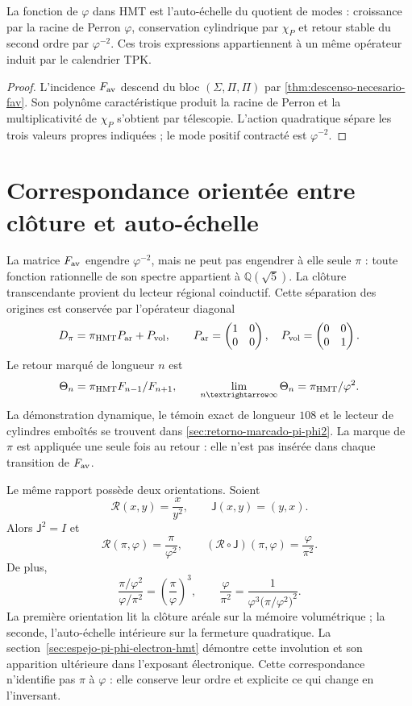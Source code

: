 \begin{proposition}
\label{prop:autoescala-phi-rev6}
La fonction de \(\varphi\) dans HMT est l'auto-échelle du quotient de modes :
croissance par la racine de Perron \(\varphi\), conservation cylindrique par
\(\chi_P\) et retour stable du second ordre par \(\varphi^{-2}\).
Ces trois expressions appartiennent à un même opérateur induit par le
calendrier TPK.
\end{proposition}

\begin{proof}
L'incidence \(F_{\rm av}\) descend du bloc
\((\Sigma,\Pi,\Pi)\) par
\cref{thm:descenso-necesario-fav}. Son polynôme caractéristique produit la
racine de Perron et la multiplicativité de \(\chi_P\) s'obtient par
télescopie. L'action quadratique sépare les trois valeurs propres indiquées ; le
mode positif contracté est \(\varphi^{-2}\).
\end{proof}

\section{Correspondance orientée entre clôture et auto-échelle}

La matrice \(F_{\rm av}\) engendre \(\varphi^{-2}\), mais ne peut pas engendrer à
elle seule \(\pi\) : toute fonction rationnelle de son spectre appartient à
\(\mathbb Q(\sqrt5)\). La clôture transcendante provient du lecteur régional
coinductif. Cette séparation des origines est conservée par l'opérateur
diagonal
\[
 D_\pi=\pi_{\rm HMT}P_{\rm ar}+P_{\rm vol},
\qquad
 P_{\rm ar}=
 \begin{pmatrix}1&0\\0&0\end{pmatrix},
\quad
 P_{\rm vol}=
 \begin{pmatrix}0&0\\0&1\end{pmatrix}.
\]
Le retour marqué de longueur \(n\) est
\[
\Theta_n
=\pi_{\rm HMT}\frac{F_{n-1}}{F_{n+1}},
\qquad
\lim_{n\to\infty}\Theta_n
=\frac{\pi_{\rm HMT}}{\varphi^2}.
\]
La démonstration dynamique, le témoin exact de longueur \(108\) et le lecteur
de cylindres emboîtés se trouvent dans
\cref{sec:retorno-marcado-pi-phi2}. La marque de \(\pi\) est appliquée une seule
fois au retour : elle n'est pas insérée dans chaque transition de \(F_{\rm av}\).

Le même rapport possède deux orientations. Soient
\[
\mathscr R(x,y)=\frac{x}{y^2},
\qquad
\mathsf J(x,y)=(y,x).
\]
Alors \(\mathsf J^2=I\) et
\[
\boxed{
\mathscr R(\pi,\varphi)=\frac{\pi}{\varphi^2},
\qquad
(\mathscr R\circ\mathsf J)(\pi,\varphi)
=\frac{\varphi}{\pi^2}.}
\]
De plus,
\[
\frac{\pi/\varphi^2}{\varphi/\pi^2}
={\left(\frac{\pi}{\varphi}\right)}^3,
\qquad
\frac{\varphi}{\pi^2}
=\frac{1}{\varphi^3{\bigl(\pi/\varphi^2\bigr)}^2}.
\]
La première orientation lit la clôture aréale sur la mémoire volumétrique ; la
seconde, l'auto-échelle intérieure sur la fermeture quadratique. La
section~\ref{sec:espejo-pi-phi-electron-hmt} démontre cette involution et son
apparition ultérieure dans l'exposant électronique. Cette correspondance n'identifie pas
\(\pi\) à \(\varphi\) : elle conserve leur ordre et explicite ce qui change en
l'inversant.

